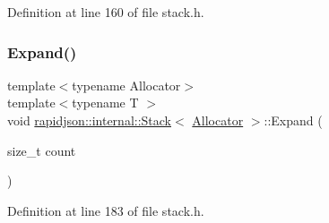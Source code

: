 Definition at line 160 of file stack.\+h.


\begin{DoxyCode}{0}

\end{DoxyCode}
\mbox{\label{classrapidjson_1_1internal_1_1_stack_a33149301e7a60dbd1fe9b66c2c9e80ea}} 
\subsubsection{\texorpdfstring{Expand()}{Expand()}}
{\footnotesize\ttfamily template$<$typename Allocator$>$ \\
template$<$typename T $>$ \\
void \mbox{\hyperlink{classrapidjson_1_1internal_1_1_stack}{rapidjson\+::internal\+::\+Stack}}$<$ \mbox{\hyperlink{classrapidjson_1_1_allocator}{Allocator}} $>$\+::Expand (\begin{DoxyParamCaption}\item[{size\+\_\+t}]{count }\end{DoxyParamCaption})\hspace{0.3cm}{\ttfamily [private]}}



Definition at line 183 of file stack.\+h.


